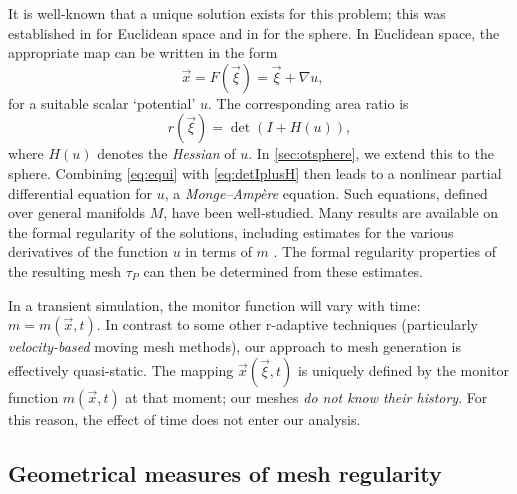 \documentclass[11pt, a4paper]{scrartcl}  %
\theoremstyle{plain}
\theoremstyle{definition}
\numberwithin{equation}{section}
\begin{document}
It is well-known that a unique solution exists for this problem; this
was established in \citet{brenier1991polar} for Euclidean space and in
\citet{mccann2001polar} for the sphere. In Euclidean space, the
appropriate map can be written in the form
\begin{equation}
  \label{eq:xiplusgradu}
  \vec{x} = F(\vec{\xi}) = \vec{\xi} + \nabla u,\quad
\end{equation}
for a suitable scalar `potential' $u$. The corresponding area ratio is
\begin{equation}
  \label{eq:detIplusH}
  r(\vec{\xi}) = \det(I + H(u)),
\end{equation}
where $H(u)$ denotes the \emph{Hessian} of $u$. In \cref{sec:otsphere},
we extend this to the sphere. Combining \cref{eq:equi} with
\cref{eq:detIplusH} then leads to a nonlinear partial differential
equation for $u$, a \emph{Monge--Ampère} equation. Such equations,
defined over general manifolds $M$, have been well-studied. Many results
are available on the formal regularity of the solutions, including
estimates for the various derivatives of the function $u$ in terms of
$m$ \citep{trudinger1984second,caffarelli1990interior,
wang1995counterexamples,gutierrez2001monge,delanoe2006gradient,
caffarelli2008regularity,loeper2009regularity,loeper2011regularity}. The
formal regularity properties of the resulting mesh $\tau_P$ can then be
determined from these estimates.

In a transient simulation, the monitor function will vary with time:
$m = m(\vec{x}, t)$. In contrast to some other r-adaptive techniques
(particularly \emph{velocity-based} moving mesh methods), our approach
to mesh generation is effectively quasi-static. The mapping
$\vec{x}(\vec{\xi}, t)$ is uniquely defined by the monitor function
$m(\vec{x}, t)$ at that moment; our meshes \emph{do not know their history}.
For this reason, the effect of time does not enter our analysis.

\subsection{Geometrical measures of mesh regularity}
\end{document}
